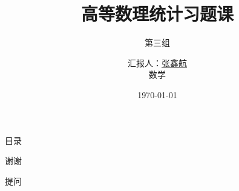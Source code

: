 \documentclass[usenames,dvipsnames,svgnames,xcolor = table]{beamer}
\title[国防科技大学 | 高等数理统计习题课]{\LARGE 高等数理统计习题课}
\subtitle{第三组} %
\author[张鑫航]{
    汇报人：\href{mailto:zhangxinhang19@foxmail.com}{张鑫航}\\
    \medskip
    数学
}
\institute{国防科技大学}
\date{\today}
\begin{document}
\begin{frame}{目录}
    \begin{multicols}{2}
        \large{
        \tableofcontents
        }%
      \end{multicols}
\end{frame}







\begin{frame}{谢谢}
\end{frame}

\begin{frame}{提问}
\end{frame}
\end{document}
